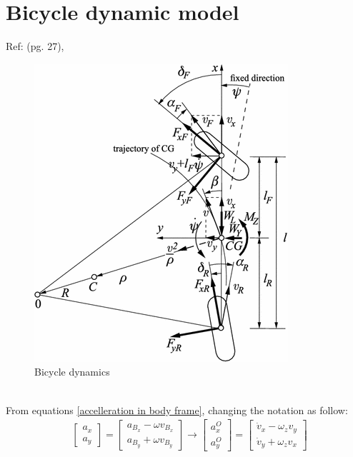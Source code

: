 \documentclass[12pt]{article}
\begin{document}
    \newpage







\section{Bicycle dynamic model}
    Ref: \cite{Vehicle dynamics ancd control} (pg. 27), \cite{MPC for Autonomous Vehicles} \\
    \begin{figure}[h]
        \centering
        \includegraphics[width=0.5\linewidth]{pictures/bicycle_model}
        \caption{Bicycle dynamics}
    \end{figure} \\
    From equations \ref{accelleration in body frame}, changing the notation as follow:
    \begin{equation}
        \begin{aligned}
            & \begin{bmatrix} a_{x} \\ a_{y} \end{bmatrix}
            = \begin{bmatrix} a_{B_x} - \omega v_{B_x} \\ a_{B_y} + \omega v_{B_y} \end{bmatrix} 
            \longrightarrow 
            \begin{bmatrix} a_{x}^O \\ a_{y}^O \end{bmatrix}
            = \begin{bmatrix} \dot{v}_x - \omega_z v_y \\ \dot{v}_y + \omega_z v_x \end{bmatrix} \\
        \end{aligned}
    \end{equation}
\end{document}
